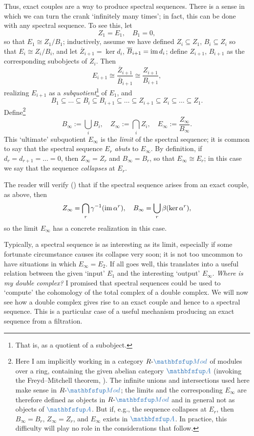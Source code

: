 Thus, exact couples are a way to produce spectral sequences. There is
a sense in which we can turn the crank `infinitely many times'; in
fact, this can be done with any spectral sequence. To see this, let
\[
  Z_1 = E_1, \quad B_1 = 0,
\]
so that $E_1 \cong Z_1/B_1$; inductively, assume we have defined
$Z_i \subseteq Z_1$, $B_i \subseteq Z_i$ so that $E_i \cong Z_i/B_i$,
and let $\overline{Z}_{i+1} = \ker d_i$,
$\overline{B}_{i+1} = \operatorname{im} d_i$; define $Z_{i+1}$, $B_{i+1}$ as the
corresponding subobjects of $Z_i$. Then
\[
  E_{i+1} \cong \frac{\overline{Z}_{i+1}}{\overline{B}_{i+1}} \cong
  \frac{Z_{i+1}}{B_{i+1}},
\]
realizing $E_{i+1}$ as a \emph{subquotient}\footnote{That is, as a
  quotient of a subobject.} of $E_1$, and
\[
  B_1 \subseteq \dots \subseteq B_i \subseteq B_{i+1} \subseteq \dots
  \subseteq Z_{i+1} \subseteq Z_i \subseteq \dots \subseteq Z_1.
\]
Define\footnote{Here I am implicitly working in a category
  $R\text{-}\categ{Mod}$ of modules over a ring, containing the given
  abelian category $\categ{A}$ (invoking the Freyd--Mitchell theorem,
  ). The infinite unions and intersections used
  here make sense in $R\text{-}\categ{Mod}$; the limits and the
  corresponding $E_\infty$ are therefore defined as objects in
  $R\text{-}\categ{Mod}$ and in general not as objects of $\categ{A}$.
  But if, e.g., the sequence collapses at $E_r$, then
  $B_\infty = B_r$, $Z_\infty = Z_r$, and $E_\infty$ exists in
  $\categ{A}$. In practice, this difficulty will play no role in the
  considerations that follow.}
\[
  B_\infty := \bigcup_i B_i, \quad Z_\infty := \bigcap_i Z_i, \quad
  E_\infty := \frac{Z_\infty}{B_\infty}.
\]
This `ultimate' subquotient $E_\infty$ is the \emph{limit} of the
spectral sequence; it is common to say that the spectral sequence
$E_r$ \emph{abuts} to $E_\infty$. By definition, if
$d_r = d_{r+1} = \dots = 0$, then $Z_\infty = Z_r$ and
$B_\infty = B_r$, so that $E_\infty \cong E_r$; in this case we say
that the sequence \emph{collapses} at $E_r$.

The reader will verify
()
that if the spectral sequence arises from an exact couple, as above,
then
\[
  Z_\infty = \bigcap_r \gamma^{-1}(\operatorname{im} \alpha^r), \quad B_\infty =
  \bigcup_r \beta(\ker \alpha^r),
\]
so the limit $E_\infty$ has a concrete realization in this case.

Typically, a spectral sequence is as interesting as its limit,
especially if some fortunate circumstance causes its collapse very
soon; it is not too uncommon to have situations in which
$E_\infty = E_2$. If all goes well, this translates into a useful
relation between the given `input' $E_1$ and the interesting `output'
$E_\infty$.  \emph{Where is my double complex?} I promised that
spectral sequences could be used to `compute' the cohomology of the
total complex of a double complex. We will now see how a double
complex gives rise to an exact couple and hence to a spectral
sequence. This is a particular case of a useful mechanism producing an
exact sequence from a filtration.

